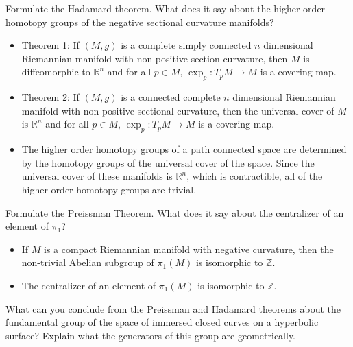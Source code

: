 \documentclass{beamer}
\begin{document}
    \begin{frame}
        Formulate the Hadamard theorem. What does it say about the higher order
        homotopy groups of the negative sectional curvature manifolds?
        \begin{itemize}
            \item Theorem 1: If $(M,g)$ is a complete simply connected
                $n$ dimensional Riemannian manifold with non-positive section
                curvature, then $M$ is diffeomorphic to $\mathbb{R}^{n}$ and for
                all $p\in{M}$, $\exp_{p}:T_{p}M\rightarrow{M}$ is a covering
                map.
            \item Theorem 2: If $(M,g)$ is a connected complete $n$
                dimensional Riemannian manifold with non-positive sectional
                curvature, then the universal cover of $M$ is $\mathbb{R}^{n}$
                and for all $p\in{M}$, $\exp_{p}:T_{p}M\rightarrow{M}$ is a
                covering map.
            \item The higher order homotopy groups of a path connected space
                are determined by the homotopy groups of the universal cover of
                the space. Since the universal cover of these manifolds is
                $\mathbb{R}^{n}$, which is contractible, all of the higher order
                homotopy groups are trivial.
        \end{itemize}
    \end{frame}
    \begin{frame}
        Formulate the Preissman Theorem. What does it say about the centralizer
        of an element of $\pi_{1}$?
        \begin{itemize}
            \item If $M$ is a compact Riemannian manifold with negative
                curvature, then the non-trivial Abelian subgroup of $\pi_{1}(M)$
                is isomorphic to $\mathbb{Z}$.
            \item The centralizer of an element of $\pi_{1}(M)$ is isomorphic
                to $\mathbb{Z}$.
        \end{itemize}
    \end{frame}
    \begin{frame}
        What can you conclude from the Preissman and Hadamard theorems about
        the fundamental group of the space of immersed closed curves on a
        hyperbolic surface? Explain what the generators of this group are
        geometrically.
    \end{frame}
\end{document}
